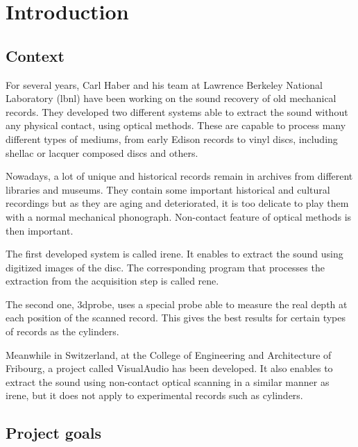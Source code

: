 %

\newcommand{\Csh}{C$^\sharp$}


\chapter{Introduction}

\section{Context}

For several years, Carl Haber and his team at Lawrence Berkeley National Laboratory (\gls{lbnl}) have been working on the sound recovery of old mechanical records. They developed two different systems able to extract the sound without any physical contact, using optical methods. These are capable to process many different types of mediums, from early Edison records to vinyl discs, including shellac or lacquer composed discs and others.

Nowadays, a lot of unique and historical records remain in archives from different libraries and museums. They contain some important historical and cultural recordings but as they are aging and deteriorated, it is too delicate to play them with a normal mechanical phonograph. Non-contact feature of optical methods is then important.

The first developed system is called \gls{irene}. It enables to extract the sound using digitized images of the disc. The corresponding program that processes the extraction from the acquisition step is called \gls{rene}.

The second one, \gls{3dprobe}, uses a special probe able to measure the real depth at each position of the scanned record. This gives the best results for certain types of records as the cylinders.

Meanwhile in Switzerland, at the College of Engineering and Architecture of Fribourg, a project called VisualAudio has been developed. It also enables to extract the sound using non-contact optical scanning in a similar manner as \gls{irene}, but it does not apply to experimental records such as cylinders.

\section{Project goals}

